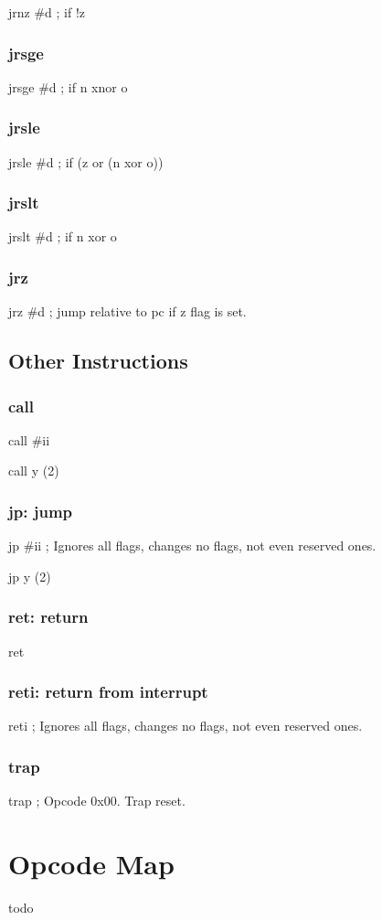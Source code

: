\documentclass{book}
\begin{document}
jrnz \#d               ; if !z


\subsection{jrsge}

jrsge \#d              ; if n xnor o


\subsection{jrsle}

jrsle \#d              ; if (z or (n xor o))


\subsection{jrslt}

jrslt \#d              ; if n xor o



\subsection{jrz}

jrz \#d                ; jump relative to pc if z flag is set.


\section{Other Instructions}

\subsection{call}

call \#ii

call y (2)


\subsection{jp: jump}

jp \#ii     ; Ignores all flags, changes no flags, not even reserved ones.

jp y (2)


\subsection{ret: return}

ret


\subsection{reti: return from interrupt}

reti ; Ignores all flags, changes no flags, not even reserved ones.


\subsection{trap}

trap ; Opcode 0x00. Trap reset.

\chapter{Opcode Map}

todo
\end{document}

